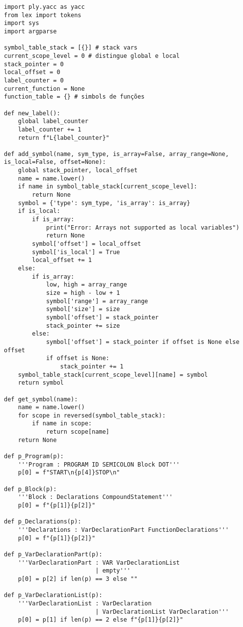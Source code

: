 \documentclass[12pt,a4paper]{report}%
\begin{document}
\begin{lstlisting}[style=pythonStyle, caption={Ficheiro lex.py}]
import ply.yacc as yacc
from lex import tokens
import sys
import argparse

symbol_table_stack = [{}] # stack vars  
current_scope_level = 0 # distingue global e local
stack_pointer = 0 
local_offset = 0 
label_counter = 0
current_function = None
function_table = {} # simbols de funções

def new_label():
    global label_counter
    label_counter += 1
    return f"L{label_counter}"

def add_symbol(name, sym_type, is_array=False, array_range=None, is_local=False, offset=None):
    global stack_pointer, local_offset
    name = name.lower()
    if name in symbol_table_stack[current_scope_level]:
        return None 
    symbol = {'type': sym_type, 'is_array': is_array}
    if is_local:
        if is_array:
            print("Error: Arrays not supported as local variables")
            return None
        symbol['offset'] = local_offset
        symbol['is_local'] = True
        local_offset += 1
    else:
        if is_array:
            low, high = array_range
            size = high - low + 1
            symbol['range'] = array_range
            symbol['size'] = size
            symbol['offset'] = stack_pointer
            stack_pointer += size
        else:
            symbol['offset'] = stack_pointer if offset is None else offset
            if offset is None:
                stack_pointer += 1
    symbol_table_stack[current_scope_level][name] = symbol
    return symbol

def get_symbol(name):
    name = name.lower()
    for scope in reversed(symbol_table_stack):
        if name in scope:
            return scope[name]
    return None

def p_Program(p):
    '''Program : PROGRAM ID SEMICOLON Block DOT'''
    p[0] = f"START\n{p[4]}STOP\n"

def p_Block(p):
    '''Block : Declarations CompoundStatement'''
    p[0] = f"{p[1]}{p[2]}"

def p_Declarations(p):
    '''Declarations : VarDeclarationPart FunctionDeclarations'''
    p[0] = f"{p[1]}{p[2]}"

def p_VarDeclarationPart(p):
    '''VarDeclarationPart : VAR VarDeclarationList
                          | empty'''
    p[0] = p[2] if len(p) == 3 else ""

def p_VarDeclarationList(p):
    '''VarDeclarationList : VarDeclaration
                          | VarDeclarationList VarDeclaration'''
    p[0] = p[1] if len(p) == 2 else f"{p[1]}{p[2]}"


\end{lstlisting}
\end{document}

